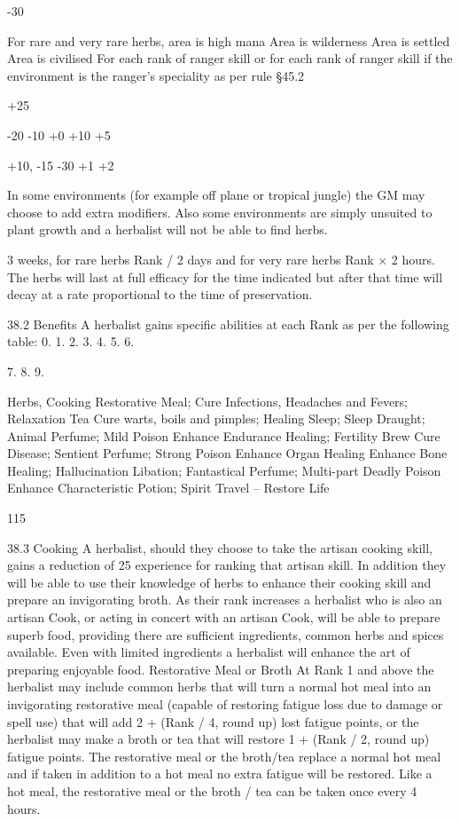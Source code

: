 \documentclass[a4paper]{article}
\begin{document}
\begin{multicols}{3}
-30

For rare and very rare herbs, area is high
mana
Area is wilderness
Area is settled
Area is civilised
For each rank of ranger skill
or for each rank of ranger skill if the environment is the ranger’s speciality as per
rule §45.2

+25

-20
-10
+0
+10
+5%

+10,
-15
-30
+1%
+2%

In some environments (for example off plane or
tropical jungle) the GM may choose to add extra
modifiers. Also some environments are simply
unsuited to plant growth and a herbalist will not be
able to find herbs.

3 weeks, for rare herbs Rank / 2 days and for very
rare herbs Rank × 2 hours. The herbs will last at
full efficacy for the time indicated but after that
time will decay at a rate proportional to the time of
preservation.

38.2 Benefits
A herbalist gains specific abilities at each Rank as
per the following table:
0.
1.
2.
3.
4.
5.
6.

7.
8.
9.

Herbs, Cooking
Restorative Meal; Cure Infections, Headaches
and Fevers; Relaxation Tea
Cure warts, boils and pimples; Healing Sleep;
Sleep Draught; Animal Perfume; Mild Poison
Enhance Endurance Healing; Fertility Brew
Cure Disease; Sentient Perfume; Strong Poison
Enhance Organ Healing
Enhance Bone Healing; Hallucination Libation; Fantastical Perfume; Multi-part Deadly
Poison
Enhance Characteristic Potion; Spirit Travel
–
Restore Life

115

38.3 Cooking
A herbalist, should they choose to take the artisan
cooking skill, gains a reduction of 25%
experience for ranking that artisan skill. In addition
they will be able to use their knowledge of herbs to
enhance their cooking skill and prepare an invigorating broth. As their rank increases a herbalist
who is also an artisan Cook, or acting in concert
with an artisan Cook, will be able to prepare superb
food, providing there are sufficient ingredients,
common herbs and spices available. Even with
limited ingredients a herbalist will enhance the art
of preparing enjoyable food.
Restorative Meal or Broth
At Rank 1 and above the herbalist may include
common herbs that will turn a normal hot meal into
an invigorating restorative meal (capable of restoring fatigue loss due to damage or spell use) that
will add 2 + (Rank / 4, round up) lost fatigue
points, or the herbalist may make a broth or tea that
will restore 1 + (Rank / 2, round up) fatigue points.
The restorative meal or the broth/tea replace a
normal hot meal and if taken in addition to a hot
meal no extra fatigue will be restored. Like a hot
meal, the restorative meal or the broth / tea can be
taken once every 4 hours.


\end{multicols}
\end{document}
